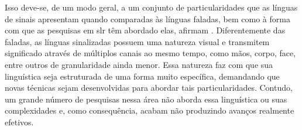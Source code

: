 Isso deve-se, de um modo geral, a um conjunto de particularidades que as línguas de sinais apresentam quando comparadas às línguas faladas, bem como à forma com que as pesquisas em \acrshort{slr} têm abordado elas, afirmam .
Diferentemente das faladas, as línguas sinalizadas possuem uma natureza visual e transmitem significado através de múltiplos canais ao mesmo tempo, como mãos, corpo, face, entre outros de granularidade ainda menor.
Essa natureza faz com que sua linguística seja estruturada de uma forma muito específica, demandando que novas técnicas sejam desenvolvidas para abordar tais particularidades.
Contudo, um grande número de pesquisas nessa área não aborda essa linguística ou suas complexidades e, como consequência, acabam não produzindo avanços realmente efetivos.





